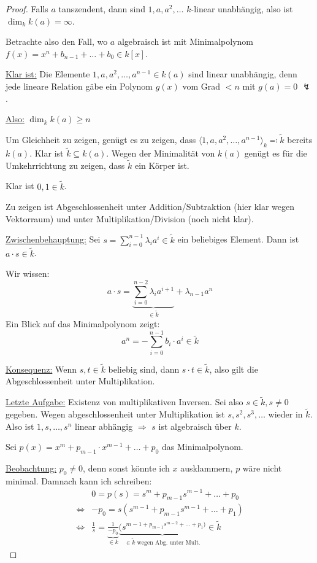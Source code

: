 \documentclass[12pt,parskip=full]{scrartcl}
\newcommand{\heading}{\underline}
\theoremstyle{definition}
\theoremstyle{remark}
\begin{document}
	\begin{proof}
		Falls $a$ tanszendent, dann sind $1,a,a^2,\dots$ $k$-linear unabhängig, also ist $\dim_k k(a) = \infty$.
		
		Betrachte also den Fall, wo $a$ algebraisch ist mit Minimalpolynom $f(x) = x^n + b_{n-1} + \dots + b_0 \in k[x]$.
		
		\heading{Klar ist:} Die Elemente $1,a,a^2, \dots, a^{n-1} \in k(a)$ sind linear unabhängig, denn jede lineare Relation gäbe ein Polynom $g(x)$ vom Grad $< n$ mit $g(a) = 0$ $\lightning$.
		
		\heading{Also:} $\dim_k k(a) \geq n$
		
		Um Gleichheit zu zeigen, genügt es zu zeigen, dass $\langle 1, a, a^2, \dots, a^{n-1} \rangle_k \eqqcolon \tilde{k}$ bereits $k(a)$. Klar ist $\tilde{k} \subseteq k(a)$. Wegen der Minimalität von $k(a)$ genügt es für die Umkehrrichtung zu zeigen, dass $\tilde{k}$ ein Körper ist.
		
		Klar ist $0,1 \in \tilde{k}$.
		
		Zu zeigen ist Abgeschlossenheit unter Addition/Subtraktion (hier klar wegen Vektorraum) und unter Multiplikation/Division (noch nicht klar).
		
		\heading{Zwischenbehauptung:} Sei $s = \sum_{i=0}^{n-1} \lambda_i a^i \in \tilde{k}$ ein beliebiges Element. Dann ist $a \cdot s \in \tilde{k}$.
		
		Wir wissen:
		\begin{equation*}
			a \cdot s = \underbrace{\sum_{i=0}^{n-2} \lambda_i a^{i+1}}_{\in \tilde{k}} + \lambda_{n-1} a^n
		\end{equation*}
		Ein Blick auf das Minimalpolynom zeigt:
		\begin{equation*}
			a^n = - \sum_{i = 0}^{n-1} b_i \cdot a^i \in \tilde{k}
		\end{equation*}
		
		\heading{Konsequenz:} Wenn $s,t \in \tilde{k}$ beliebig sind, dann $s \cdot t \in \tilde{k}$, also gilt die Abgeschlossenheit unter Multiplikation.
		
		\heading{Letzte Aufgabe:} Existenz von multiplikativen Inversen. Sei also $s \in \tilde{k}, s \neq 0$ gegeben. Wegen abgeschlossenheit unter Multiplikation ist $s, s^2, s^3, \dots$ wieder in $\tilde{k}$. Also ist $1,s, \dots, s^n$ linear abhängig $\Rightarrow$ $s$ ist algebraisch über $k$.
		
		Sei $p(x) = x^m + p_{m-1} \cdot x^{m-1} + \dots + p_0$ das Minimalpolynom.
		
		\heading{Beobachtung:} $p_0 \neq 0$, denn sonst könnte ich $x$ ausklammern, $p$ wäre nicht minimal. Damnach kann ich schreiben:
		\begin{align*}
			&0 = p(s) = s^m + p_{m-1} s^{m-1} + \dots + p_0 \\
			\Leftrightarrow& - p_0 = s(s^{m-1} + p_{m-1} s^{m-1} + \dots + p_1) \\
			\Leftrightarrow& \frac{1}{s} = \underbrace{\frac{1}{-p_0}}_{\in k} \underbrace{(s^{m-1 + p_{m-1} s^{m-2} + \dots + p_1)}}_{\in \tilde{k} \text{ wegen Abg. unter Mult.}} \in \tilde{k}
		\end{align*}
	\end{proof}
\end{document}
